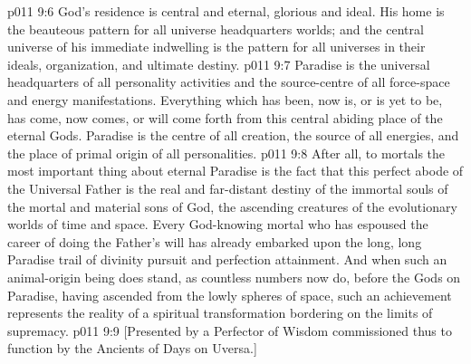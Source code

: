 \vs p011 9:6 \pc God’s residence is central and eternal, glorious and ideal. His home is the beauteous pattern for all universe headquarters worlds; and the central universe of his immediate indwelling is the pattern for all universes in their ideals, organization, and ultimate destiny.
\vs p011 9:7 Paradise is the universal headquarters of all personality activities and the source\hyp{}centre of all force\hyp{}space and energy manifestations. Everything which has been, now is, or is yet to be, has come, now comes, or will come forth from this central abiding place of the eternal Gods. Paradise is the centre of all creation, the source of all energies, and the place of primal origin of all personalities.
\vs p011 9:8 \pc After all, to mortals the most important thing about eternal Paradise is the fact that this perfect abode of the Universal Father is the real and far\hyp{}distant destiny of the immortal souls of the mortal and material sons of God, the ascending creatures of the evolutionary worlds of time and space. Every God\hyp{}knowing mortal who has espoused the career of doing the Father’s will has already embarked upon the long, long Paradise trail of divinity pursuit and perfection attainment. And when such an animal\hyp{}origin being does stand, as countless numbers now do, before the Gods on Paradise, having ascended from the lowly spheres of space, such an achievement represents the reality of a spiritual transformation bordering on the limits of supremacy.
\vsetoff
\vs p011 9:9 [Presented by a Perfector of Wisdom commissioned thus to function by the Ancients of Days on Uversa.]
\quizlink
